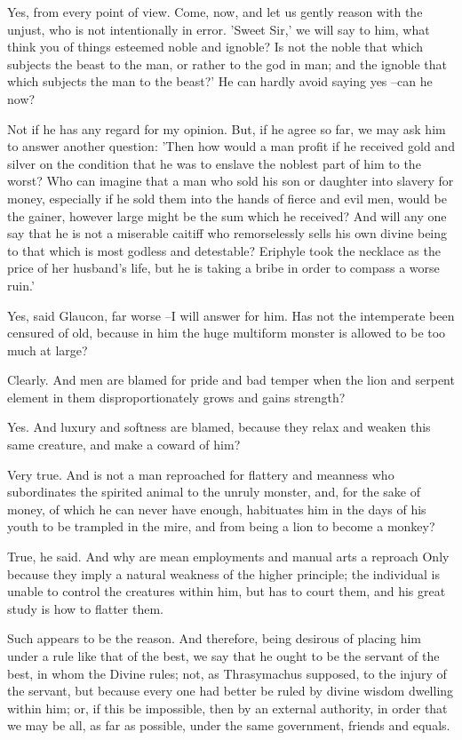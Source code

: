 Yes, from every point of view.
Come, now, and let us gently reason with the unjust, who is not intentionally in error. 'Sweet Sir,' we will say to him, what think you of things esteemed noble and ignoble? Is not the noble that which subjects the beast to the man, or rather to the god in man; and the ignoble that which subjects the man to the beast?' He can hardly avoid saying yes --can he now?

Not if he has any regard for my opinion.
But, if he agree so far, we may ask him to answer another question: 'Then how would a man profit if he received gold and silver on the condition that he was to enslave the noblest part of him to the worst? Who can imagine that a man who sold his son or daughter into slavery for money, especially if he sold them into the hands of fierce and evil men, would be the gainer, however large might be the sum which he received? And will any one say that he is not a miserable caitiff who remorselessly sells his own divine being to that which is most godless and detestable? Eriphyle took the necklace as the price of her husband's life, but he is taking a bribe in order to compass a worse ruin.'

Yes, said Glaucon, far worse --I will answer for him.
Has not the intemperate been censured of old, because in him the huge multiform monster is allowed to be too much at large?

Clearly.
And men are blamed for pride and bad temper when the lion and serpent element in them disproportionately grows and gains strength?

Yes.
And luxury and softness are blamed, because they relax and weaken this same creature, and make a coward of him?

Very true.
And is not a man reproached for flattery and meanness who subordinates the spirited animal to the unruly monster, and, for the sake of money, of which he can never have enough, habituates him in the days of his youth to be trampled in the mire, and from being a lion to become a monkey?

True, he said.
And why are mean employments and manual arts a reproach Only because they imply a natural weakness of the higher principle; the individual is unable to control the creatures within him, but has to court them, and his great study is how to flatter them.

Such appears to be the reason.
And therefore, being desirous of placing him under a rule like that of the best, we say that he ought to be the servant of the best, in whom the Divine rules; not, as Thrasymachus supposed, to the injury of the servant, but because every one had better be ruled by divine wisdom dwelling within him; or, if this be impossible, then by an external authority, in order that we may be all, as far as possible, under the same government, friends and equals.

